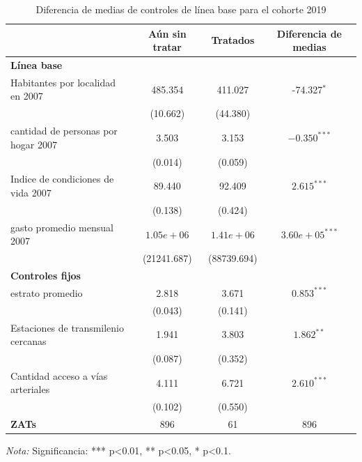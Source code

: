 \documentclass{article}
\begin{document}
\begin{table} [H]
  \centering
  \caption{Diferencia de medias de controles de línea base para el cohorte 2019}
  \label{tab:comparacion_2019}
  \begin{tabular}{l c c c}
    \toprule
    & \textbf{Aún sin tratar} & \textbf{Tratados} & \textbf{Diferencia de medias} \\
    \midrule
    \multicolumn{4}{l}{\textbf{Línea base}} \\
    \midrule
    Habitantes por localidad en 2007 & 485.354 & 411.027 & -74.327$^{*}$ \\
    & (10.662) & (44.380) & \\
    cantidad de personas por hogar 2007 & 3.503 & 3.153 & $-0.350^{***}$ \\
    & (0.014) & (0.059) & \\
    Indice de condiciones de vida 2007 & 89.440 & 92.409 & $2.615^{***}$ \\
    & (0.138) & (0.424) & \\
    gasto promedio mensual 2007 & $1.05e+06$ & $1.41e+06$ & $3.60e+05^{***}$ \\
    & (21241.687) & (88739.694) & \\
    \midrule
    \multicolumn{4}{l}{\textbf{Controles fijos}} \\
    \midrule
    estrato promedio & 2.818 & 3.671 & $0.853^{***}$ \\
    & (0.043) & (0.141) & \\
    Estaciones de transmilenio cercanas & 1.941 & 3.803 & $1.862^{**}$ \\
    & (0.087) & (0.352) & \\
    Cantidad acceso a vías arteriales & 4.111 & 6.721 & $2.610^{***}$ \\
    & (0.102) & (0.550) & \\
    \midrule
    \textbf{ZATs} & 896 & 61 & 896 \\
    \bottomrule
  \end{tabular}
  \parbox[t]{\textwidth}{%
    \vspace{0.5em}
    \footnotesize{ \textit{Nota:} Significancia: *** p<0.01, ** p<0.05, * p<0.1.}}
\end{table}
\end{document}
